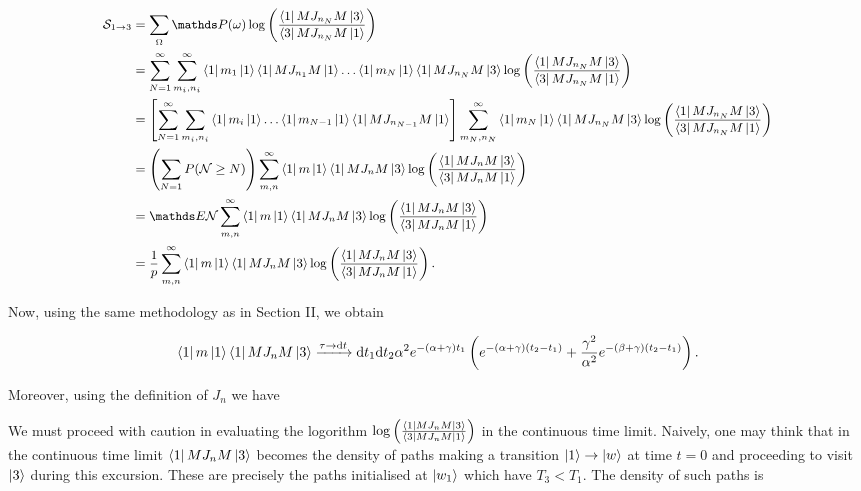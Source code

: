 \begin{align}\label{half-cycle-EP}
\small
\begin{split}
    \mathcal{S}_{1 \rightarrow 3} &= \sum_{\Omega}\bP(\omega)\log\left ( \frac{\bra{1}MJ_{n_N}M\ket{3}}{\bra{3}MJ_{n_N}M\ket{1}}\right) \\
    &= \sum_{N=1}^\infty \sum_{m_i,n_i}^\infty \bra{ 1}m_1\ket{1}\bra{1}MJ_{n_1}M\ket{1}\ldots\bra{1}m_N\ket{1}\bra{1}MJ_{n_N}M\ket{3} \log\left ( \frac{\bra{1}MJ_{n_N}M\ket{3}}{\bra{3}MJ_{n_N}M\ket{1}}\right) \\
    &= \left[\sum_{N=1}^\infty \sum_{m_i, n_i}\bra{1}m_i\ket{1}\ldots\bra{1}m_{N-1}\ket{1}\bra{1}MJ_{n_{N-1}}M\ket{1} \right] \sum_{m_N,n_N}^\infty \bra{1}m_N\ket{1}\bra{1}MJ_{n_N}M\ket{3}\log\left( \frac{\bra{1}MJ_{n_N}M\ket{3}}{\bra{3}MJ_{n_N}M\ket{1}}\right) \\
    &= \left(\sum_{N=1}P(\mathcal{N} \geq N)\right)\sum_{m,n}^\infty \bra{1}m\ket{1}\bra{1}MJ_{n}M\ket{3}\log\left( \frac{\bra{1}MJ_{n}M\ket{3}}{\bra{3}MJ_{n}M\ket{1}}\right) \\
    &= \bE \mathcal{N} \sum_{m,n}^\infty \bra{1}m\ket{1}\bra{1}MJ_{n}M\ket{3}\log\left( \frac{\bra{1}MJ_{n}M\ket{3}}{\bra{3}MJ_{n}M\ket{1}}\right) \\
    &= \frac{1}{p} \sum_{m,n}^\infty \bra{1}m\ket{1}\bra{1}MJ_{n}M\ket{3}\log\left( \frac{\bra{1}MJ_{n}M\ket{3}}{\bra{3}MJ_{n}M\ket{1}}\right).
\end{split}
\end{align}

Now, using the same methodology as in Section II, we obtain

\begin{align}
\bra{1}m\ket{1}\bra{1}MJ_{n}M\ket{3} \xrightarrow{\tau \rightarrow \mathrm{d} t} \mathrm{d} t_1 \mathrm{d} t_2 \alpha^2 e^{-(\alpha + \gamma)t_1}\left(e^{-(\alpha + \gamma)(t_2-t_1)} + \frac{\gamma^2}{\alpha^2}e^{-(\beta+\gamma)(t_2-t_1)}\right).
\end{align}

Moreover, using the definition of $J_n$ we have



We must proceed with caution in evaluating the logorithm $\log\left( \frac{\bra{1}MJ_{n}M\ket{3}}{\bra{3}MJ_{n}M\ket{1}}\right)$ in the continuous time limit. Naively, one may think that in the continuous time limit $\bra{1}MJ_nM\ket{3}$ becomes the density of paths making a transition $\ket{1} \rightarrow \ket{w}$ at time $t = 0$ and proceeding to visit $\ket{3}$ during this excursion. These are precisely the paths initialised at $\ket{w_1}$ which have $T_3 < T_1$. The density of such paths is 

